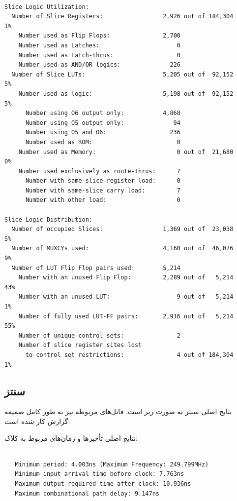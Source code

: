 \documentclass[12pt,titlepage,a4page , tikz , multi,table , svgnames,xcdraw]{article}
\begin{document}
\begin{latin}
\begin{verbatim}

Slice Logic Utilization:
  Number of Slice Registers:                 2,926 out of 184,304    1%
    Number used as Flip Flops:               2,700
    Number used as Latches:                      0
    Number used as Latch-thrus:                  0
    Number used as AND/OR logics:              226
  Number of Slice LUTs:                      5,205 out of  92,152    5%
    Number used as logic:                    5,198 out of  92,152    5%
      Number using O6 output only:           4,868
      Number using O5 output only:              94
      Number using O5 and O6:                  236
      Number used as ROM:                        0
    Number used as Memory:                       0 out of  21,680    0%
    Number used exclusively as route-thrus:      7
      Number with same-slice register load:      0
      Number with same-slice carry load:         7
      Number with other load:                    0

Slice Logic Distribution:
  Number of occupied Slices:                 1,369 out of  23,038    5%
  Number of MUXCYs used:                     4,160 out of  46,076    9%
  Number of LUT Flip Flop pairs used:        5,214
    Number with an unused Flip Flop:         2,289 out of   5,214   43%
    Number with an unused LUT:                   9 out of   5,214    1%
    Number of fully used LUT-FF pairs:       2,916 out of   5,214   55%
    Number of unique control sets:               2
    Number of slice register sites lost
      to control set restrictions:               4 out of 184,304    1%

\end{verbatim}
\end{latin}

\subsection{سنتز }

نتایج اصلی سنتز به صورت زیر است. فایل‌های مربوطه نیز به طور کامل ضمیمه گزارش کار شده است:

نتایج اصلی تأخیرها و زمان‌های مربوط به کلاک:

\begin{latin}
\begin{verbatim}

   Minimum period: 4.003ns (Maximum Frequency: 249.799MHz)
   Minimum input arrival time before clock: 7.763ns
   Maximum output required time after clock: 10.936ns
   Maximum combinational path delay: 9.147ns


\end{verbatim}
\end{latin}
\end{document}
